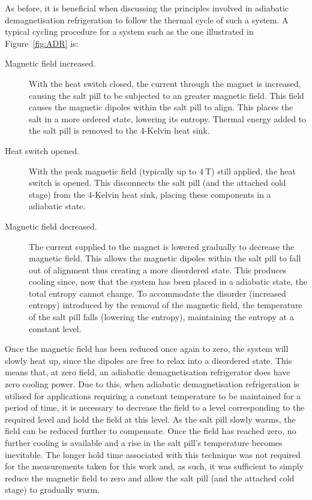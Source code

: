 \par 
As before, it is beneficial when discussing the principles involved in adiabatic demagnetisation refrigeration to follow the thermal cycle of such a system. A typical cycling procedure for a system such as the one illustrated in Figure~\ref{fig:ADR} is:
\begin{description}
\item[Magnetic field increased.] With the heat switch closed, the current through the magnet is increased, causing the salt pill to be subjected to an greater magnetic field. This field causes the magnetic dipoles within the salt pill to align. This places the salt in a more ordered state, lowering its entropy. Thermal energy added to the salt pill is removed to the 4-Kelvin heat sink.
\item[Heat switch opened.] With the peak magnetic field (typically up to $4~\mathrm{T}$) still applied, the heat switch is opened. This disconnects the salt pill (and the attached cold stage) from the 4-Kelvin heat sink, placing these components in a adiabatic state.
\item[Magnetic field decreased.] The current supplied to the magnet is lowered gradually to decrease the magnetic field. This allows the magnetic dipoles within the salt pill to fall out of alignment thus creating a more disordered state. This produces cooling since, now that the system has been placed in a adiabatic state, the total entropy cannot change. To accommodate the disorder (increased entropy) introduced by the removal of the magnetic field, the temperature of the salt pill falls (lowering the entropy), maintaining the entropy at a constant level.
\end{description}
\par 
Once the magnetic field has been reduced once again to zero, the system will slowly heat up, since the dipoles are free to relax into a disordered state. This means that, at zero field, an adiabatic demagnetisation refrigerator does have zero cooling power. Due to this, when adiabatic demagnetisation refrigeration is utilised for applications requiring a constant temperature to be maintained for a period of time, it is necessary to decrease the field to a level corresponding to the required level and hold the field at this level. As the salt pill slowly warms, the field can be reduced further to compensate. Once the field has reached zero, no further cooling is available and a rise in the salt pill's temperature becomes inevitable. The longer hold time associated with this technique was not required for the measurements taken for this work and, as such, it was sufficient to simply reduce the magnetic field to zero and allow the salt pill (and the attached cold stage) to gradually warm.
